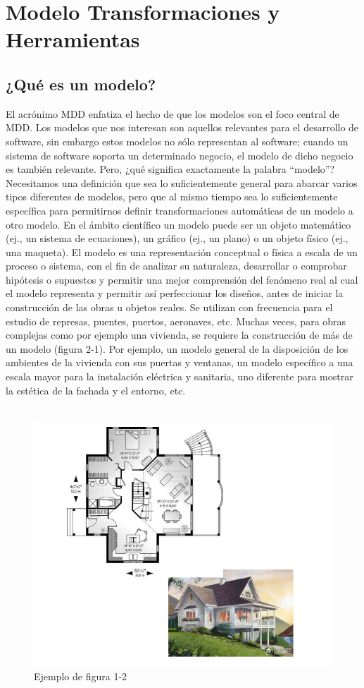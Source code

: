 \section{Modelo Transformaciones y Herramientas}
\subsection{¿Qué es un modelo?}
El acrónimo MDD enfatiza el hecho de que los modelos son el foco central de MDD. Los modelos que nos interesan son aquellos relevantes para el desarrollo de software, sin embargo estos modelos no sólo representan al software; cuando un sistema de software soporta un determinado negocio, el modelo de dicho negocio es también relevante. Pero, ¿qué significa exactamente la palabra “modelo”? Necesitamos una definición que sea lo suficientemente general para abarcar varios tipos diferentes de modelos, pero que al mismo tiempo sea lo suficientemente específica para permitirnos definir transformaciones automáticas de un modelo a otro modelo. En el ámbito científico un modelo puede ser un objeto matemático (ej., un sistema de ecuaciones), un gráfico (ej., un plano) o un objeto físico (ej., una maqueta). El modelo es una representación conceptual o física a escala de un proceso o sistema, con el fin de analizar su naturaleza, desarrollar o comprobar hipótesis o supuestos y permitir una mejor comprensión del fenómeno real al cual el modelo representa y permitir así perfeccionar los diseños, antes de iniciar la construcción de las obras u objetos reales. Se utilizan con frecuencia para el estudio de represas, puentes, puertos, aeronaves, etc. Muchas veces, para obras complejas como por ejemplo una vivienda, se requiere la construcción de más de un modelo (figura 2-1). Por ejemplo, un modelo general de la disposición de los ambientes de la vivienda con sus puertas y ventanas, un modelo específico a una escala mayor para la instalación eléctrica y sanitaria, uno diferente para mostrar la estética de la fachada y el entorno, etc.
\\\\
\begin{figure}[H]
\centering
\includegraphics[scale=0.5]{./Imagenes/modelo1}
\caption{Ejemplo de figura 1-2}
\label{figura1}
\end{figure}

